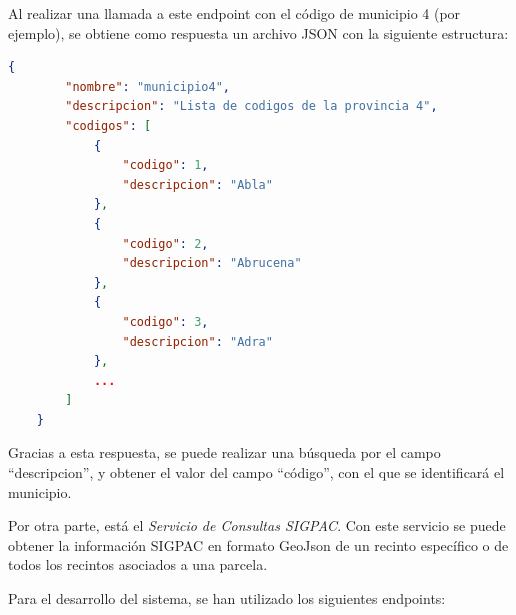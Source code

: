 \begin{itemize}
    Al realizar una llamada a este endpoint con el código de municipio 4 (por ejemplo), se obtiene como respuesta un 
    archivo JSON con la siguiente estructura:

    \begin{lstlisting}[language=json,caption={Listado de municipios SIGPAC}]
    {
        "nombre": "municipio4",
        "descripcion": "Lista de codigos de la provincia 4",
        "codigos": [
            {
                "codigo": 1,
                "descripcion": "Abla"
            },
            {
                "codigo": 2,
                "descripcion": "Abrucena"
            },
            {
                "codigo": 3,
                "descripcion": "Adra"
            },
            ...
        ]
    }
    \end{lstlisting}

    Gracias a esta respuesta, se puede realizar una búsqueda por el campo ``descripcion'', y obtener el valor del 
    campo ``código'', con el que se identificará el municipio.
\end{itemize}

Por otra parte, está el \textit{Servicio de Consultas SIGPAC}. Con este servicio se puede obtener la información 
SIGPAC en formato GeoJson de un recinto específico o de todos los recintos asociados a una parcela.

Para el desarrollo del sistema, se han utilizado los siguientes endpoints:

